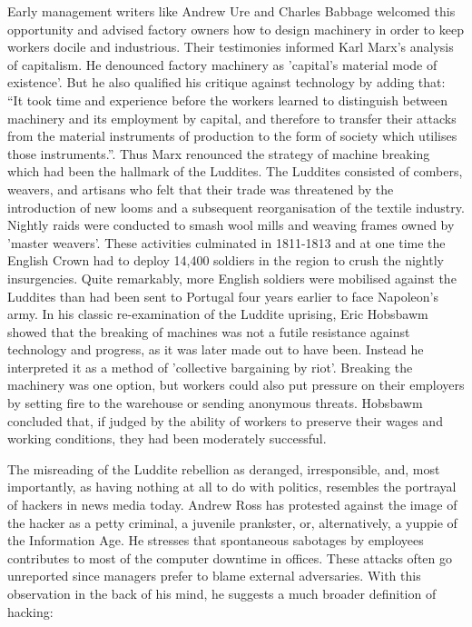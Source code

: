 Early management writers like Andrew Ure and Charles Babbage welcomed this
opportunity and advised factory owners how to design machinery in order to keep
workers docile and industrious\cite{gnunited-ure1835, gnunited-babbage71}. Their
testimonies informed Karl Marx's analysis of capitalism. He denounced factory
machinery as 'capital's material mode of existence'. But he also qualif\hbox{}ied his
critique against technology by adding that: ``It took time and experience before
the workers learned to distinguish between machinery and its employment by
capital, and therefore to transfer their attacks from the material instruments
of production to the form of society which utilises those
instruments.''\cite{gnunited-marx76}. Thus Marx renounced the strategy of
machine breaking which had been the hallmark of the Luddites. The Luddites
consisted of combers, weavers, and artisans who felt that their trade was
threatened by the introduction of new looms and a subsequent reorganisation of
the textile industry. Nightly raids were conducted to smash wool mills and
weaving frames owned by 'master weavers'. These activities culminated in
1811-1813 and at one time the English Crown had to deploy 14,400 soldiers in the
region to crush the nightly insurgencies. Quite remarkably, more English
soldiers were mobilised against the Luddites than had been sent to Portugal four
years earlier to face Napoleon's army\cite{gnunited-sale95}. In his classic
re-examination of the Luddite uprising, Eric Hobsbawm showed that the breaking
of machines was not a futile resistance against technology and progress, as it
was later made out to have been. Instead he interpreted it as a method of
'collective bargaining by riot'. Breaking the machinery was one option, but
workers could also put pressure on their employers by setting f\hbox{}ire to the
warehouse or sending anonymous threats. Hobsbawm concluded that, if judged by
the ability of workers to preserve their wages and working conditions, they had
been moderately successful\cite{gnunited-hobsbawm52}.

The misreading of the Luddite rebellion as deranged, irresponsible, and, most
importantly, as having nothing at all to do with politics, resembles the
portrayal of hackers in news media today. Andrew Ross has protested against the
image of the hacker as a petty criminal, a juvenile prankster, or,
alternatively, a yuppie of the Information Age. He stresses that spontaneous
sabotages by employees contributes to most of the computer downtime in
of\hbox{}f\hbox{}ices.  These attacks often go unreported since managers prefer to blame
external adversaries. With this observation in the back of his mind, he suggests
a much broader def\hbox{}inition of hacking: 

